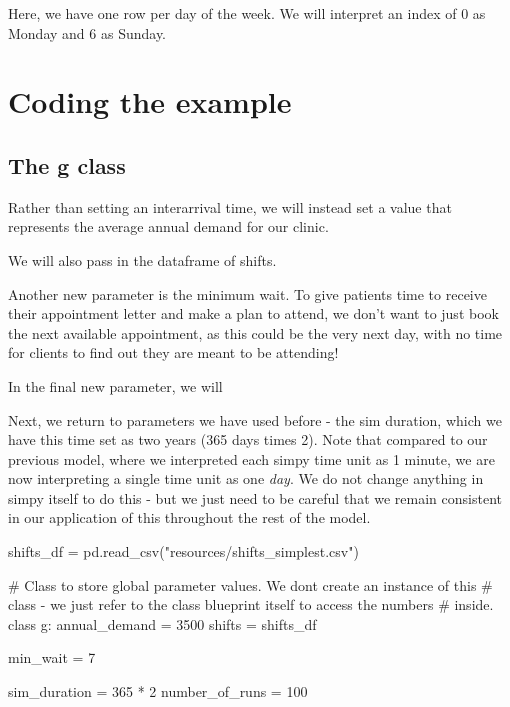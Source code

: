 \documentclass[
  letterpaper,
  DIV=11,
  numbers=noendperiod]{scrreprt}
\newenvironment{Shaded}{\begin{snugshade}}{\end{snugshade}}
\newcommand{\CommentTok}[1]{\textcolor[rgb]{0.37,0.37,0.37}{#1}}
\newcommand{\DecValTok}[1]{\textcolor[rgb]{0.68,0.00,0.00}{#1}}
\newcommand{\KeywordTok}[1]{\textcolor[rgb]{0.00,0.23,0.31}{#1}}
\newcommand{\NormalTok}[1]{\textcolor[rgb]{0.00,0.23,0.31}{#1}}
\newcommand{\OperatorTok}[1]{\textcolor[rgb]{0.37,0.37,0.37}{#1}}
\newcommand{\StringTok}[1]{\textcolor[rgb]{0.13,0.47,0.30}{#1}}
\begin{document}
Here, we have one row per day of the week. We will interpret an index of
0 as Monday and 6 as Sunday.

\section{Coding the example}\label{coding-the-example}

\subsection{The g class}\label{the-g-class-9}

Rather than setting an interarrival time, we will instead set a value
that represents the average annual demand for our clinic.

We will also pass in the dataframe of shifts.

Another new parameter is the minimum wait. To give patients time to
receive their appointment letter and make a plan to attend, we don't
want to just book the next available appointment, as this could be the
very next day, with no time for clients to find out they are meant to be
attending!

In the final new parameter, we will

Next, we return to parameters we have used before - the sim duration,
which we have this time set as two years (365 days times 2). Note that
compared to our previous model, where we interpreted each simpy time
unit as 1 minute, we are now interpreting a single time unit as one
\emph{day}. We do not change anything in simpy itself to do this - but
we just need to be careful that we remain consistent in our application
of this throughout the rest of the model.

\begin{Shaded}
\begin{Highlighting}[]
\NormalTok{shifts\_df }\OperatorTok{=}\NormalTok{ pd.read\_csv(}\StringTok{"resources/shifts\_simplest.csv"}\NormalTok{)}

\CommentTok{\# Class to store global parameter values.  We don\textquotesingle{}t create an instance of this}
\CommentTok{\# class {-} we just refer to the class blueprint itself to access the numbers}
\CommentTok{\# inside.}
\KeywordTok{class}\NormalTok{ g:}
\NormalTok{    annual\_demand }\OperatorTok{=} \DecValTok{3500}
\NormalTok{    shifts }\OperatorTok{=}\NormalTok{ shifts\_df}

\NormalTok{    min\_wait }\OperatorTok{=} \DecValTok{7}

\NormalTok{    sim\_duration }\OperatorTok{=} \DecValTok{365} \OperatorTok{*} \DecValTok{2}
\NormalTok{    number\_of\_runs }\OperatorTok{=} \DecValTok{100}
\end{Highlighting}
\end{Shaded}
\end{document}
